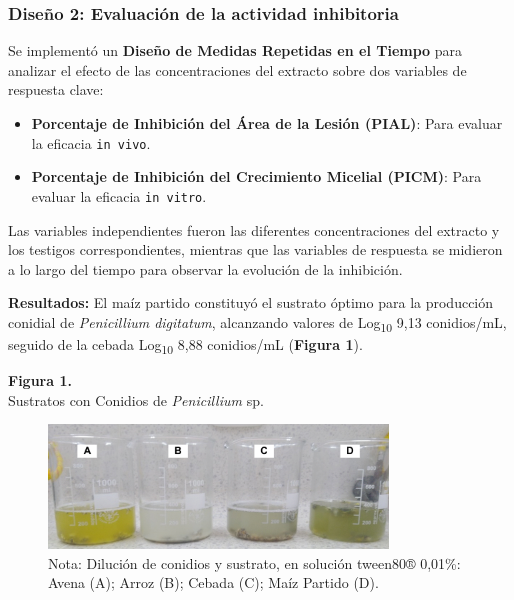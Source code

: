 \documentclass[
  spanish,
  letterpaper,
  DIV=11,
  numbers=noendperiod]{scrreprt}
\begin{document}
\subsubsection{Diseño 2: Evaluación de la actividad
inhibitoria}\label{diseuxf1o-2-evaluaciuxf3n-de-la-actividad-inhibitoria}

Se implementó un \textbf{Diseño de Medidas Repetidas en el Tiempo} para
analizar el efecto de las concentraciones del extracto sobre dos
variables de respuesta clave:

\begin{itemize}
\item
  \textbf{Porcentaje de Inhibición del Área de la Lesión (PIAL)}: Para
  evaluar la eficacia \texttt{in\ vivo}.
\item
  \textbf{Porcentaje de Inhibición del Crecimiento Micelial (PICM)}:
  Para evaluar la eficacia \texttt{in\ vitro}.
\end{itemize}

Las variables independientes fueron las diferentes concentraciones del
extracto y los testigos correspondientes, mientras que las variables de
respuesta se midieron a lo largo del tiempo para observar la evolución
de la inhibición.

\textbf{Resultados:} El maíz partido constituyó el sustrato óptimo para
la producción conidial de \emph{Penicillium digitatum}, alcanzando
valores de Log\textsubscript{10} 9,13 conidios/mL, seguido de la cebada
Log\textsubscript{10} 8,88 conidios/mL (\textbf{Figura 1}).

\textbf{Figura 1.}\\
Sustratos con Conidios de \emph{Penicillium} sp.

\begin{figure}[H]

{\centering \includegraphics[width=3.55208in,height=\textheight,keepaspectratio]{images/3_DCA/sustrato.png}

}

\caption{Nota: Dilución de conidios y sustrato, en solución tween80®
0,01\%: Avena (A); Arroz (B); Cebada (C); Maíz Partido (D).}

\end{figure}%
\end{document}
